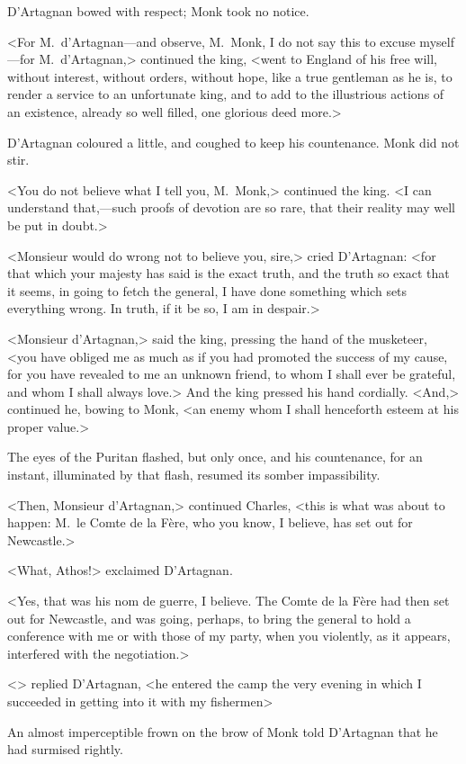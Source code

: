 D'Artagnan bowed with respect; Monk took no notice.

<For M.~d'Artagnan—and observe, M.~Monk, I do not say this to excuse myself—for M.~d'Artagnan,> continued the king, <went to England of his free will, without interest, without orders, without hope, like a true gentleman as he is, to render a service to an unfortunate king, and to add to the illustrious actions of an existence, already so well filled, one glorious deed more.>

D'Artagnan coloured a little, and coughed to keep his countenance. Monk did not stir.

<You do not believe what I tell you, M.~Monk,> continued the king. <I can understand that,—such proofs of devotion are so rare, that their reality may well be put in doubt.>

<Monsieur would do wrong not to believe you, sire,> cried D'Artagnan: <for that which your majesty has said is the exact truth, and the truth so exact that it seems, in going to fetch the general, I have done something which sets everything wrong. In truth, if it be so, I am in despair.>

<Monsieur d'Artagnan,> said the king, pressing the hand of the musketeer, <you have obliged me as much as if you had promoted the success of my cause, for you have revealed to me an unknown friend, to whom I shall ever be grateful, and whom I shall always love.> And the king pressed his hand cordially. <And,> continued he, bowing to Monk, <an enemy whom I shall henceforth esteem at his proper value.>

The eyes of the Puritan flashed, but only once, and his countenance, for an instant, illuminated by that flash, resumed its somber impassibility.

<Then, Monsieur d'Artagnan,> continued Charles, <this is what was about to happen: M.~le Comte de la Fère, who you know, I believe, has set out for Newcastle.>

<What, Athos!> exclaimed D'Artagnan.

<Yes, that was his nom de guerre, I believe. The Comte de la Fère had then set out for Newcastle, and was going, perhaps, to bring the general to hold a conference with me or with those of my party, when you violently, as it appears, interfered with the negotiation.>

<> replied D'Artagnan, <he entered the camp the very evening in which I succeeded in getting into it with my fishermen\longdash>

An almost imperceptible frown on the brow of Monk told D'Artagnan that he had surmised rightly.

